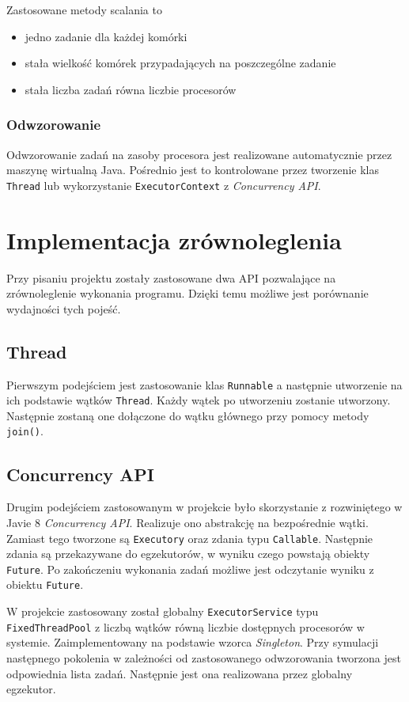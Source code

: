 \documentclass{mwart}
\begin{document}
Zastosowane metody scalania to
\begin{itemize}
  \item jedno zadanie dla każdej komórki
  \item stała wielkość komórek przypadających na poszczególne zadanie
  \item stała liczba zadań równa liczbie procesorów
\end{itemize}

\subsubsection{Odwzorowanie}
Odwzorowanie zadań na zasoby procesora jest realizowane automatycznie przez maszynę wirtualną Java. Pośrednio jest to kontrolowane przez tworzenie klas \texttt{Thread} lub wykorzystanie \texttt{ExecutorContext} z \textit{Concurrency API}.

\section{Implementacja zrównoleglenia}
Przy pisaniu projektu zostały zastosowane dwa API pozwalające na zrównoleglenie wykonania programu. Dzięki temu możliwe jest porównanie wydajności tych pojeść.

\subsection{Thread}
Pierwszym podejściem jest zastosowanie klas \texttt{Runnable} a następnie utworzenie na ich podstawie wątków \texttt{Thread}. Każdy wątek po utworzeniu zostanie utworzony. Następnie zostaną one dołączone do wątku głównego przy pomocy metody \texttt{join()}.

\subsection{Concurrency API}
Drugim podejściem zastosowanym w projekcie było skorzystanie z rozwiniętego w Javie 8 \textit{Concurrency API}. Realizuje ono abstrakcję na bezpośrednie wątki. Zamiast tego tworzone są \texttt{Executory} oraz zdania typu \texttt{Callable}. Następnie zdania są przekazywane do egzekutorów, w wyniku czego powstają obiekty \texttt{Future}. Po zakończeniu wykonania zadań możliwe jest odczytanie wyniku z obiektu \texttt{Future}.

W projekcie zastosowany został globalny \texttt{ExecutorService} typu \texttt{FixedThreadPool} z liczbą wątków równą liczbie dostępnych procesorów w systemie. Zaimplementowany na podstawie wzorca \textit{Singleton}.
Przy symulacji następnego pokolenia w zależności od zastosowanego odwzorowania tworzona jest odpowiednia lista zadań. Następnie jest ona realizowana przez globalny egzekutor.
\end{document}
